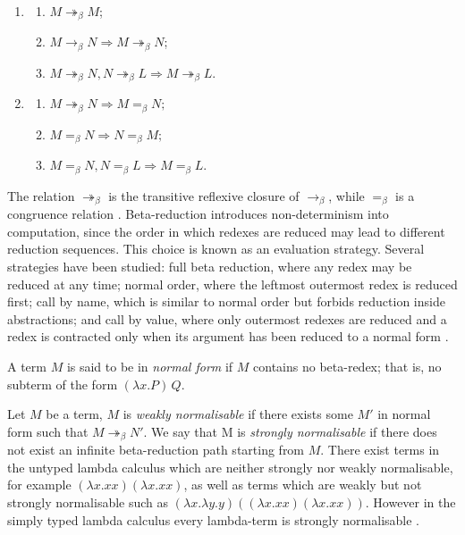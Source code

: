 \begin{enumerate}
    \item \begin{enumerate}
        \item $M \twoheadrightarrow_\beta M$;
        \item $M \to_\beta N \Rightarrow M \twoheadrightarrow_\beta N$; 
        \item $M \twoheadrightarrow_\beta N, N \twoheadrightarrow_\beta L \Rightarrow M \twoheadrightarrow_\beta L$.
    \end{enumerate}
    \item \begin{enumerate}
        \item $M \twoheadrightarrow_\beta N \Rightarrow M =_\beta N;$
        \item $M =_\beta N \Rightarrow N =_\beta M;$
        \item $M =_\beta N, N =_\beta L \Rightarrow M =_\beta L.$
    \end{enumerate}
\end{enumerate}
The relation $\twoheadrightarrow_\beta$ is the transitive reflexive closure of $\to_\beta$, while $=_\beta$ is a congruence relation \cite{Barendregt2013-BARLCW}.
Beta-reduction introduces non-determinism into computation, since the order in which redexes are reduced may lead to different reduction sequences. This choice is known as an evaluation strategy. Several strategies have been studied: full beta reduction, where any redex may be reduced at any time; normal order, where the leftmost outermost redex is reduced first; call by name, which is similar to normal order but forbids reduction inside abstractions; and call by value, where only outermost redexes are reduced and a redex is contracted only when its argument has been reduced to a normal form \cite{types-and-programming-languages}. 

A term $M$ is said to be in \textit{normal form} if $M$ contains no beta-redex; that is, no subterm of the form $(\lambda x.P)\,Q$. 

Let $M$ be a term, $M$ is \textit{weakly normalisable} if there exists some $M'$ in normal form such that $M \twoheadrightarrow_\beta N'$. We say that M is \textit{strongly normalisable} if there does not exist an infinite beta-reduction path starting from $M$. There exist terms in the untyped lambda calculus which are neither strongly nor weakly
normalisable, for example $(\lambda x.xx)(\lambda x.xx)$, as well as terms which are weakly but not
strongly normalisable such as $(\lambda x. \lambda y.y)((\lambda x.xx)(\lambda x.xx))$. However in the simply typed lambda calculus every lambda-term is strongly normalisable \cite{Girard1989-GIRPAT}.

